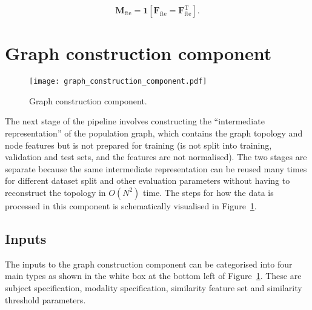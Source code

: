 \begin{equation}
    \mathbf{M}_{\text{fte}} = \mathbf{1}\left[\mathbf{F}_{\text{fte}}^{\ } = \mathbf{F}_{\text{fte}}^{\mathrm{T}} \right].
\end{equation}




\section{Graph construction component}

\begin{figure}[h]
    \texttt{[image: graph\_construction\_component.pdf]}
    \caption{Graph construction component.}\label{graph-construction-component}
\end{figure}

The next stage of the pipeline involves constructing the ``intermediate representation'' of the population graph, which contains the graph topology and node features but is not prepared for training (is not split into training, validation and test sets, and the features are not normalised). The two stages are separate because the same intermediate representation can be reused many times for different dataset split and other evaluation parameters without having to reconstruct the topology in $O(N^2)$ time. The steps for how the data is processed in this component is schematically visualised in Figure~\ref{graph-construction-component}.

\subsection{Inputs}
The inputs to the graph construction component can be categorised into four main types as shown in the white box at the bottom left of Figure~\ref{graph-construction-component}. These are subject specification, modality specification, similarity feature set and similarity threshold parameters.

